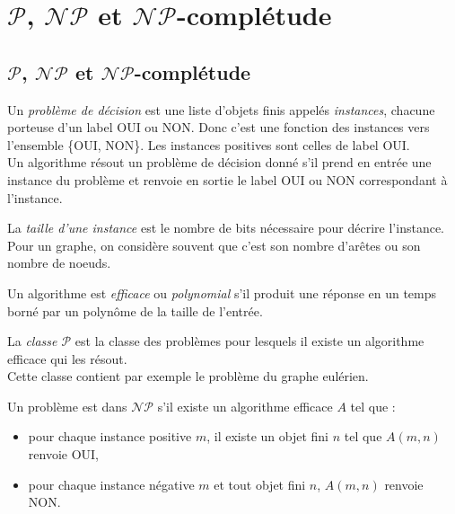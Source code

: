 \section{$\mathcal{P}$, $\mathcal{NP}$ et $\mathcal{NP}$-complétude}
\subsection{$\mathcal{P}$, $\mathcal{NP}$ et $\mathcal{NP}$-complétude}
\begin{mydef}
  Un \emph{problème de décision} est une liste d’objets finis appelés \emph{instances}, chacune porteuse d’un label OUI ou NON. Donc c’est une fonction des instances vers l’ensemble \{OUI, NON\}. Les instances positives sont celles de label OUI.\\
  Un algorithme résout un problème de décision donné s’il prend en entrée une instance du problème et renvoie en sortie le label OUI ou NON correspondant à l’instance.
\end{mydef}

\begin{mydef}
  La \emph{taille d’une instance} est le nombre de bits nécessaire pour décrire l’instance. Pour un graphe, on considère souvent que c’est son nombre d’arêtes ou son nombre de noeuds.
\end{mydef}

\begin{mydef}
  Un algorithme est \emph{efficace} ou \emph{polynomial} s’il produit une réponse en un temps borné par un polynôme de la taille de l’entrée.
\end{mydef}

\begin{mydef}
  La \emph{classe $\mathcal{P}$} est la classe des problèmes pour lesquels il existe un algorithme efficace qui les résout.\\
  Cette classe contient par exemple le problème du graphe eulérien.
\end{mydef}

\begin{mydef}
  Un problème est dans $\mathcal{NP}$ s’il existe un algorithme efficace $A$ tel que : 
  \begin{itemize}
    \item pour chaque instance positive $m$, il existe un objet fini $n$ tel que $A(m, n)$ renvoie OUI,
    \item pour chaque instance négative $m$ et tout objet fini $n$, $A(m, n)$ renvoie NON.
  \end{itemize}
\end{mydef}

